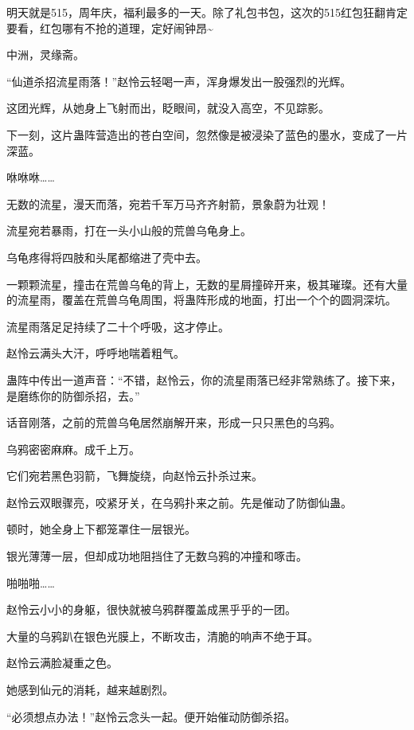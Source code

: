 
\begin{this_body}



明天就是515，周年庆，福利最多的一天。除了礼包书包，这次的515红包狂翻肯定要看，红包哪有不抢的道理，定好闹钟昂\~{}

中洲，灵缘斋。

“仙道杀招流星雨落！”赵怜云轻喝一声，浑身爆发出一股强烈的光辉。

这团光辉，从她身上飞射而出，眨眼间，就没入高空，不见踪影。

下一刻，这片蛊阵营造出的苍白空间，忽然像是被浸染了蓝色的墨水，变成了一片深蓝。

咻咻咻……

无数的流星，漫天而落，宛若千军万马齐齐射箭，景象蔚为壮观！

流星宛若暴雨，打在一头小山般的荒兽乌龟身上。

乌龟疼得将四肢和头尾都缩进了壳中去。

一颗颗流星，撞击在荒兽乌龟的背上，无数的星屑撞碎开来，极其璀璨。还有大量的流星雨，覆盖在荒兽乌龟周围，将蛊阵形成的地面，打出一个个的圆洞深坑。

流星雨落足足持续了二十个呼吸，这才停止。

赵怜云满头大汗，呼呼地喘着粗气。

蛊阵中传出一道声音：“不错，赵怜云，你的流星雨落已经非常熟练了。接下来，是磨练你的防御杀招，去。”

话音刚落，之前的荒兽乌龟居然崩解开来，形成一只只黑色的乌鸦。

乌鸦密密麻麻。成千上万。

它们宛若黑色羽箭，飞舞旋绕，向赵怜云扑杀过来。

赵怜云双眼骤亮，咬紧牙关，在乌鸦扑来之前。先是催动了防御仙蛊。

顿时，她全身上下都笼罩住一层银光。

银光薄薄一层，但却成功地阻挡住了无数乌鸦的冲撞和啄击。

啪啪啪……

赵怜云小小的身躯，很快就被乌鸦群覆盖成黑乎乎的一团。

大量的乌鸦趴在银色光膜上，不断攻击，清脆的响声不绝于耳。

赵怜云满脸凝重之色。

她感到仙元的消耗，越来越剧烈。

“必须想点办法！”赵怜云念头一起。便开始催动防御杀招。


\end{this_body}
